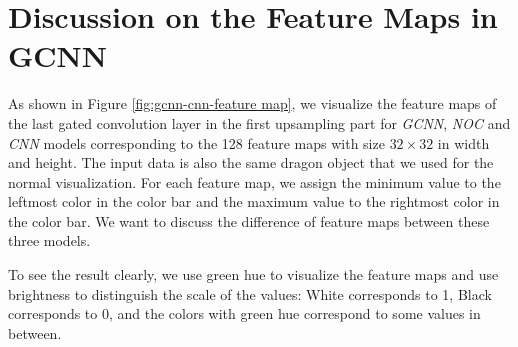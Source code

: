 \section{Discussion on the Feature Maps in GCNN}

As shown in Figure \ref{fig:gcnn-cnn-feature map}, we visualize the feature maps of the last gated convolution layer in the first upsampling part for \textit{GCNN}, \textit{NOC} and \textit{CNN} models corresponding to the 128 feature maps with size $ 32\times 32 $ in width and height. 
The input data is also the same dragon object that we used for the normal visualization. For each feature map, we assign the minimum value to the leftmost color in the color bar and the maximum value to the rightmost color in the color bar. 
We want to discuss the difference of feature maps between these three models.

To see the result clearly, we use green hue to visualize the feature maps and use brightness to distinguish the scale of the values: White corresponds to 1, Black corresponds to 0, and the colors with green hue correspond to some values in between. 

